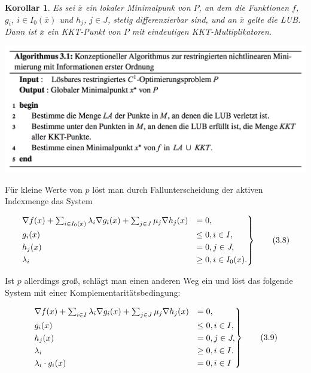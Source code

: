 \documentclass[11pt]{scrreprt}
\newcounter{thm}
\theoremstyle{thmstyle}
\numberwithin{thm}{section}
\newtheorem{korollar}[thm]{Korollar}
\begin{document}
\begin{korollar}
	Es sei $\overline{x}$ ein lokaler Minimalpunk von $P$, an dem die Funktionen $f$, $g_i$, $i \in I_0(\overline{x})$ und $h_j$, $j \in J$, stetig differenzierbar sind, und an $\overline{x}$ gelte die LUB. Dann ist $\overline{x}$ ein KKT-Punkt von $P$ mit eindeutigen KKT-Multiplikatoren.
\end{korollar}

\begin{center}
	\includegraphics[scale=0.5]{img/a31}
\end{center}
 
Für kleine Werte von $p$ löst man durch Fallunterscheidung der aktiven Indexmenge das System

\begin{equation}
	\begin{rcases}
	\nabla f(x) + \sum_{i \in I_0(x)} \lambda_i \nabla g_i(x) + \sum_{j \in J} \mu_j \nabla h_j(x) & = 0, \\
	g_i(x) & \leq 0, i \in I, \\
	h_j(x) & = 0, j \in J, \\
	\lambda_i & \geq 0, i \in I_0(x).
\end{rcases} \tag*{(3.8)}
\end{equation}

Ist $p$ allerdings groß, schlägt man einen anderen Weg ein und löst das folgende System mit einer Komplementaritätsbedingung:

\begin{equation}
	\begin{rcases}
	\nabla f(x) + \sum_{i \in I} \lambda_i \nabla g_i(x) + \sum_{j \in J} \mu_j \nabla h_j(x) & = 0, \\
	g_i(x) & \leq 0, i \in I, \\
	h_j(x) & = 0, j \in J, \\
	\lambda_i & \geq 0, i \in I. \\
	\lambda_i \cdot g_i(x) & = 0, i \in I
\end{rcases} \tag*{(3.9)}
\end{equation}
\end{document}
